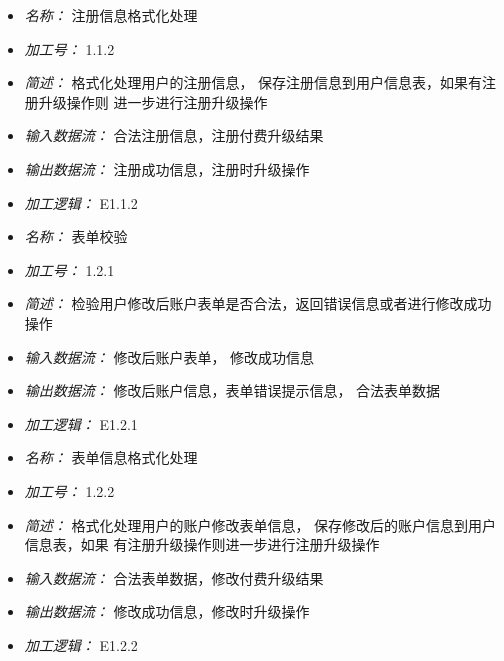 \vspace{-1mm}


\begin{itemize}
\item \textit{名称： } 注册信息格式化处理
\item \textit{加工号： } 1.1.2
\item \textit{简述： } 格式化处理用户的注册信息， 保存注册信息到用户信息表，如果有注册升级操作则 进一步进行注册升级操作
\item \textit{输入数据流： } 合法注册信息，注册付费升级结果
\item \textit{输出数据流： } 注册成功信息，注册时升级操作
\item \textit{加工逻辑： } E1.1.2

\end{itemize}


\vspace{-1mm}


\begin{itemize}
\item \textit{名称： } 表单校验
\item \textit{加工号： } 1.2.1
\item \textit{简述： } 检验用户修改后账户表单是否合法，返回错误信息或者进行修改成功操作 
\item \textit{输入数据流： } 修改后账户表单， 修改成功信息
\item \textit{输出数据流： } 修改后账户信息，表单错误提示信息， 合法表单数据
\item \textit{加工逻辑： } E1.2.1

\end{itemize}


\vspace{-1mm}


\begin{itemize}
\item \textit{名称： } 表单信息格式化处理
\item \textit{加工号： } 1.2.2
\item \textit{简述： } 格式化处理用户的账户修改表单信息， 保存修改后的账户信息到用户信息表，如果 有注册升级操作则进一步进行注册升级操作
\item \textit{输入数据流： } 合法表单数据，修改付费升级结果
\item \textit{输出数据流： } 修改成功信息，修改时升级操作
\item \textit{加工逻辑： } E1.2.2

\end{itemize}


